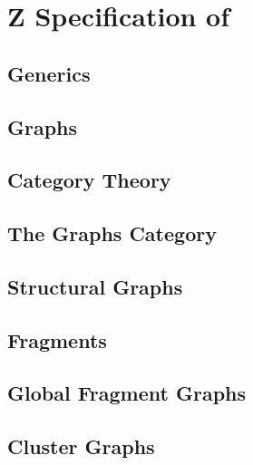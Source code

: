 
\chapter{Z Specification of \Fragmenta}
\label{ch:Z-Fragmenta}

\section{Generics}



\section{Graphs}



\section{Category Theory}



\section{The Graphs Category}



\section{Structural Graphs}



\section{Fragments}



\section{Global Fragment Graphs}



\section{Cluster Graphs}

